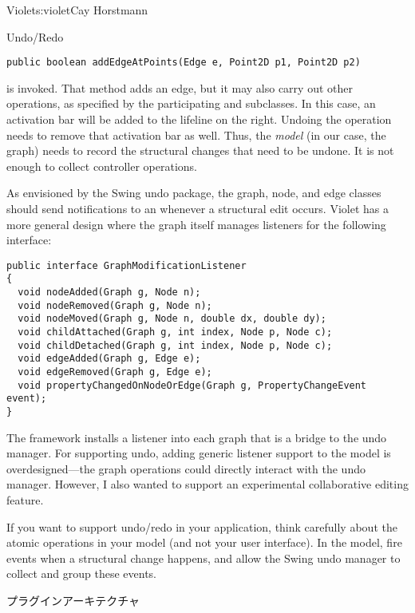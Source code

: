 \begin{aosachapter}{Violet}{s:violet}{Cay Horstmann}
\begin{aosasect1}{Undo/Redo}
\begin{verbatim}
public boolean addEdgeAtPoints(Edge e, Point2D p1, Point2D p2)
\end{verbatim}

\noindent
is invoked. That method adds an edge, but it may also carry out other
operations, as specified by the participating  and
 subclasses. In this case, an activation bar will be added
to the lifeline on the right. Undoing the operation needs to remove
that activation bar as well. Thus, the \emph{model} (in our case, the
graph) needs to record the structural changes that need to be
undone. It is not enough to collect controller operations.

As envisioned by the Swing undo package, the graph, node, and edge
classes should send  notifications to an
 whenever a structural edit occurs. Violet has a
more general design where the graph itself manages listeners for the
following interface:

\begin{verbatim}
public interface GraphModificationListener
{
  void nodeAdded(Graph g, Node n);
  void nodeRemoved(Graph g, Node n);
  void nodeMoved(Graph g, Node n, double dx, double dy);
  void childAttached(Graph g, int index, Node p, Node c);
  void childDetached(Graph g, int index, Node p, Node c);
  void edgeAdded(Graph g, Edge e);
  void edgeRemoved(Graph g, Edge e);
  void propertyChangedOnNodeOrEdge(Graph g, PropertyChangeEvent event);
}
\end{verbatim}

The framework installs a listener into each graph that is a bridge to
the undo manager. For supporting undo, adding generic listener support to 
the model is overdesigned---the graph operations could directly interact
with the undo manager. However, I also wanted to support an experimental
collaborative editing feature.

If you want to support undo/redo in your application, think carefully
about the atomic operations in your model (and not your user
interface).  In the model, fire events when a structural change
happens, and allow the Swing undo manager to collect and group these
events.

\end{aosasect1}

\begin{aosasect1}{プラグインアーキテクチャ}


\end{aosasect1}
\end{aosachapter}
